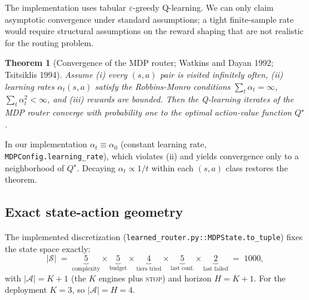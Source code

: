 \documentclass[11pt]{article}
\newtheorem{theorem}{Theorem}
\theoremstyle{definition}
\begin{document}
The implementation uses tabular $\varepsilon$-greedy Q-learning. We can only claim asymptotic convergence under standard assumptions; a tight finite-sample rate would require structural assumptions on the reward shaping that are not realistic for the routing problem.

\begin{theorem}[Convergence of the MDP router; Watkins and Dayan 1992; Tsitsiklis 1994]
\label{thm:qlearning}
Assume (i) every $(s,a)$ pair is visited infinitely often, (ii) learning rates $\alpha_t(s,a)$ satisfy the Robbins-Monro conditions $\sum_t \alpha_t = \infty$, $\sum_t \alpha_t^2 < \infty$, and (iii) rewards are bounded. Then the Q-learning iterates of the MDP router converge with probability one to the optimal action-value function $Q^\star$.
\end{theorem}

In our implementation $\alpha_t \equiv \alpha_0$ (constant learning rate, \texttt{MDPConfig.learning\_rate}), which violates (ii) and yields convergence only to a neighborhood of $Q^\star$. Decaying $\alpha_t \propto 1/t$ within each $(s,a)$ class restores the theorem.

\subsection{Exact state-action geometry}
\label{sec:mdp-geometry}

The implemented discretization (\texttt{learned\_router.py::MDPState.to\_tuple}) fixes the state space exactly:
\[
    |\mathcal{S}| \;=\; \underbrace{5}_{\text{complexity}} \times \underbrace{5}_{\text{budget}} \times \underbrace{4}_{\text{tiers tried}} \times \underbrace{5}_{\text{last conf.}} \times \underbrace{2}_{\text{last failed}} \;=\; 1000,
\]
with $|\mathcal{A}| = K + 1$ (the $K$ engines plus \textsc{stop}) and horizon $H = K + 1$. For the deployment $K = 3$, so $|\mathcal{A}| = H = 4$.
\end{document}
